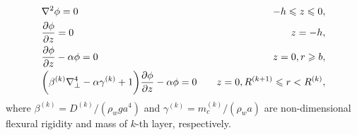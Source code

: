 \documentclass{jfm}
\begin{document}
\begin{eqnarray}%
\vspace{1mm}%
& \displaystyle \nabla^2\phi=0 & -h\le z\le 0, \label{eq1L} \\ %
\vspace{1mm}%
&\displaystyle \frac{\partial \phi}{\partial z}=0&  z=-h, \label{eq1B} \\
\vspace{1mm}%
&\displaystyle \frac{\partial \phi}{\partial z}-\alpha \phi=0&  z=0, r\ge b,\label{eq1F} \\ %
&\displaystyle \bigg(\beta^{(k)}\nabla_\perp^4-\alpha\gamma^{(k)}+1\bigg)\frac{\partial \phi}{\partial z}-\alpha \phi=0\quad& z=0, R^{(k+1)}\le r < R^{(k)}, \label{eq1Ck}%
\end{eqnarray}%
%
where $\beta^{(k)}=D^{(k)}/(\rho_wga^4)$ and $\gamma^{(k)}=m_c^{(k)}/(\rho_w a)$ are non-dimensional flexural rigidity and mass of $k$-th layer, respectively. 





\end{document}
